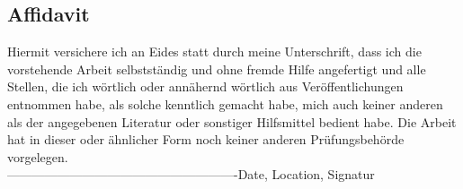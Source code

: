 \documentclass[oneside,bibliography=totocnumbered,BCOR=5mm]{scrbook}%
\theoremstyle{definition}
\theoremstyle{definition}
\theoremstyle{definition}
\theoremstyle{definition}
\theoremstyle{definition}
\theoremstyle{definition}
\begin{document}
\begin{appendix}
\newpage
\thispagestyle{empty}       %
\noindent

\section*{Affidavit}
Hiermit versichere ich an Eides statt durch meine Unterschrift, dass ich die vorstehende Arbeit selbstst\"andig und ohne fremde Hilfe angefertigt und alle Stellen, die ich w\"ortlich oder ann\"ahernd w\"ortlich aus Ver\"offentlichungen entnommen habe, als solche kenntlich gemacht habe, mich auch keiner anderen als der angegebenen Literatur oder sonstiger Hilfsmittel bedient habe. Die Arbeit hat in dieser oder \"ahnlicher Form noch keiner anderen Pr\"ufungsbeh\"orde vorgelegen.\\
\linebreak[4]
\linebreak[4]
\linebreak[4]
\linebreak[4]
-------------------------------------------------------\linebreak[4]
Date, Location, Signatur


\end{appendix}
\end{document}
